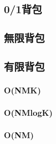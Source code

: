 \documentclass[12pt,oneside]{article}
\begin{document}
\subsection{0/1背包}
\subsection{無限背包}
\subsection{有限背包}
\subsubsection{O(NMK)}
\subsubsection{O(NMlogK)}
\subsubsection{O(NM)}
\end{document}
